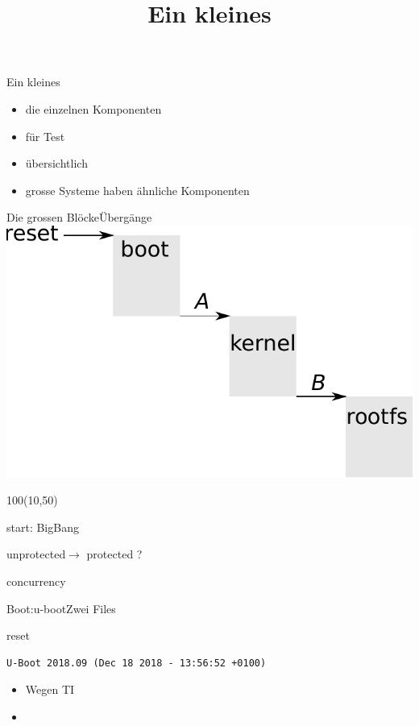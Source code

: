 \documentclass{beamer}
\begin{document}
\newcommand{\md}{\cod{md-bbb-{\em version}.img}}
\newcommand{\mdev}{\cod{md-bbb-devel-{\em version}.tar.gz}}
\title[Minimal]{Ein kleines \unix}

\frame{\titlepage}

\begin{frame}{Ein kleines \unix}
 \begin{itemize}
  \item die einzelnen Komponenten
  \item für Test
  \item übersichtlich
  \item grosse Systeme haben ähnliche Komponenten
 \end{itemize}
\end{frame}

\begin{frame}{Die grossen Blöcke}{Übergänge}
\includegraphics[width=\textwidth]{components.pdf}
\begin{textblock}{100}(10,50)
 \begin{description}[reset]
  \item[reset] start: BigBang
  \item[A] unprotected$\to$ protected ?
  \item[B] concurrency
 \end{description}
\end{textblock}
\end{frame}

\begin{frame}[fragile]{Boot:u-boot}{Zwei Files}
\begin{block}{reset}
{\tiny
\begin{verbatim}
U-Boot 2018.09 (Dec 18 2018 - 13:56:52 +0100)
\end{verbatim}
}
\end{block}
 \begin{itemize}
  \item {} Wegen TI
  \item {}
 \end{itemize}
\end{frame}
\end{document}
